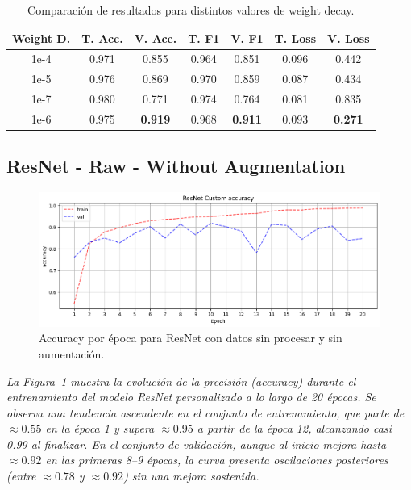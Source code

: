 \documentclass[conference]{IEEEtran}
\begin{document}
\begin{table}[h]
    \centering
    \begin{tabular}{|c|c|c|c|c|c|c|}
        \hline
        \textbf{Weight D.} & \textbf{T. Acc.} & \textbf{V. Acc.} & \textbf{T. F1} & \textbf{V. F1} & \textbf{T. Loss} & \textbf{V. Loss} \\
        \hline
        1e-4 & 0.971 & 0.855 & 0.964 & 0.851 & 0.096 & 0.442 \\
        1e-5 & 0.976 & 0.869 & 0.970 & 0.859 & 0.087 & 0.434 \\
        1e-7 & 0.980 & 0.771 & 0.974 & 0.764 & 0.081 & 0.835 \\
        1e-6 & 0.975 & \textbf{0.919} & 0.968 & \textbf{0.911} & 0.093 & \textbf{0.271} \\
        \hline
    \end{tabular}
    \caption{Comparación de resultados para distintos valores de weight decay.}
    \label{tab:weight-decay}
\end{table}

\subsection{ResNet - Raw - Without Augmentation}

\begin{figure}[H]
    \centering
    \includegraphics[width=0.95\linewidth]{graphics-resnet-raw/resnet_raw_without_accuracy.png}
    \caption{Accuracy por época para ResNet con datos sin procesar y sin aumentación.}
    \label{fig:resnet_raw_without_accuracy}
\end{figure}
\noindent\textit{%
La Figura~\ref{fig:resnet_raw_without_accuracy} muestra la evolución de la precisión (accuracy) durante el entrenamiento del modelo ResNet personalizado a lo largo de 20 épocas. Se observa una tendencia ascendente en el conjunto de entrenamiento, que parte de \(\approx0.55\) en la época 1 y supera \(\approx0.95\) a partir de la época 12, alcanzando casi 0.99 al finalizar. En el conjunto de validación, aunque al inicio mejora hasta \(\approx0.92\) en las primeras 8–9 épocas, la curva presenta oscilaciones posteriores (entre \(\approx0.78\) y \(\approx0.92\)) sin una mejora sostenida.
}
\end{document}

